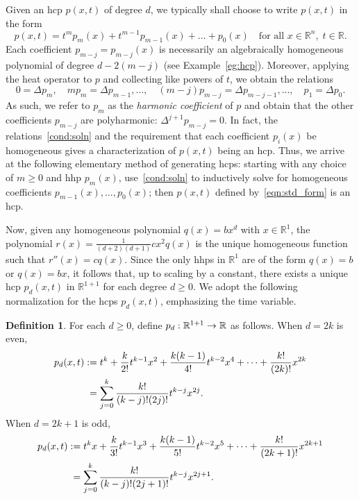 \documentclass[10pt]{amsart}
\theoremstyle{definition}\newtheorem{defi}[theo]{Definition}\newtheorem{rema}[theo]{Remark}\newtheorem{exam}[theo]{Example}\newtheorem{exem}[theo]{Example}\newtheorem{nota}[theo]{Notation}
\newcommand{\R}{\mathbb{R}}
\newcommand*{\Mk}{\mkern -2mu}
\newcommand*{\MK}{\mkern 2mu}
\renewcommand*{\to}{\mathchoice{\longrightarrow}{\rightarrow}{\rightarrow}{\rightarrow}}
\begin{document}
Given an hcp $p(x,t)$ of degree $d$, we typically shall choose to write $p(x,t)$ in the form
\begin{equation}\label{eqn:std_form}
p(x,t) = t^m p_m(x) + t^{m-1} p_{m-1}(x) + \dots + p_0(x)\quad \text{for all }x\in\R^n, \;t\in\R.
\end{equation}
Each coefficient $p_{m-j}=p_{m-j}(x)$ is necessarily an algebraically homogeneous polynomial of degree $d - 2(m-j)$ (see Example~\ref{eg:hcp}). Moreover, applying the heat operator to $p$ and collecting like powers of $t$, we obtain the relations
\begin{equation}\label{cond:soln}
0 = \Delta p_m,\quad m p_m = \Delta p_{m-1}, \dots, \quad (m-j) p_{m-j} = \Delta p_{m-j-1},\dots,\quad p_1 = \Delta p_0.
\end{equation}
As such, we refer to $p_m$ as the \emph{harmonic coefficient} of $p$ and obtain that the other coefficients $p_{m-j}$ are polyharmonic: $\Delta^{j+1} p_{m-j} = 0$. In fact, the relations~\eqref{cond:soln} and the requirement that each coefficient $p_i(x)$ be homogeneous gives a characterization of $p(x,t)$ being an hcp. Thus, we arrive at the following elementary method of generating hcps: starting with any choice of $m\geq 0$ and hhp $p_m(x)$, use~\eqref{cond:soln} to inductively solve for homogeneous coefficients $p_{m-1}(x), \dots, p_0(x)$; then $p(x,t)$ defined by~\eqref{eqn:std_form} is an hcp.

Now, given any homogeneous polynomial $q(x)=bx^d$ with $x\in\R^1$, the polynomial $r(x)=\frac{1}{(d+2)(d+1)}cx^2q(x)$ is the unique homogeneous function such that $r''(x)=cq(x)$. Since the only hhps in $\R^1$ are of the form $q(x)=b$ or $q(x)=bx$, it follows that, up to scaling by a constant, there exists a unique hcp $p_d(x,t)$ in $\R^{1+1}$ for each degree $d\geq 0$. We adopt the following normalization for the hcps $p_d(x,t)$, emphasizing the time variable.

\begin{defi}\label{def:basic-p}
For each $d\geq 0$, define $p_d:\R^{1+1}\to\R$ as follows. When $d=2k$ is even,
\begin{align*}
p_{d}(x,t) \,\MK &\!\Mk:= t^k + \frac{k}{2!} t^{k-1} x^2 + \frac{k(k-1)}{4!} t^{k-2} x^4 + \dots + \frac{k!}{(2k)!} x^{2k} \\
&= \sum_{j=0}^k \frac{k!}{(k-j)! (2j)!} t^{k-j} x^{2j}.
\end{align*}
When $d=2k+1$ is odd,
\begin{align*}
p_{d}(x,t) \,\MK &\!\Mk:= t^k x + \frac{k}{3!} t^{k-1} x^3 + \frac{k(k-1)}{5!} t^{k-2} x^5 + \dots + \frac{k!}{(2k+1)!} x^{2k+1} \\
&= \sum_{j=0}^k \frac{k!}{(k-j)! (2j+1)!} t^{k-j} x^{2j+1}.
\end{align*}
\end{defi}
\end{document}
